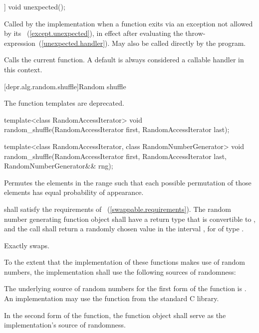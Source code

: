 %
\begin{itemdecl}
[[noreturn]] void unexpected();
\end{itemdecl}

\begin{itemdescr}
\pnum
\remarks
Called by the implementation when a function exits via an exception not allowed by its
~(\ref{except.unexpected}), in
effect after evaluating the throw-expression~(\ref{unexpected.handler}).
May also be called directly by the program.

\pnum
\effects
Calls the current  function.
\enternote A default  is always considered a callable handler in
this context. \exitnote
\end{itemdescr}

[depr.alg.random.shuffle]{Random shuffle}

%
The function templates  are deprecated.

\begin{itemdecl}
template<class RandomAccessIterator>
  void random_shuffle(RandomAccessIterator first,
                      RandomAccessIterator last);

template<class RandomAccessIterator, class RandomNumberGenerator>
  void random_shuffle(RandomAccessIterator first,
                      RandomAccessIterator last,
                      RandomNumberGenerator&& rng);
\end{itemdecl}

\begin{itemdescr}
\pnum
\effects
Permutes the elements in the range
such that each possible permutation of those elements has equal probability of appearance.

\pnum
\requires
{} shall satisfy the requirements of
~(\ref{swappable.requirements}). The random number
generating function object  shall have a return type that is
convertible to ,
and the call  shall return a randomly chosen value in the
interval , for  of type
.

\pnum
\complexity
Exactly
swaps.

\pnum
\notes
To the extent that the implementation of these functions makes use of random numbers, the implementation shall use the following sources of randomness:

The underlying source of random numbers for the first form of the function
is . An implementation may use the
function from the standard C library.

In the second form of the function, the
 function object
 shall serve as the implementation's source of randomness.

\end{itemdescr}
